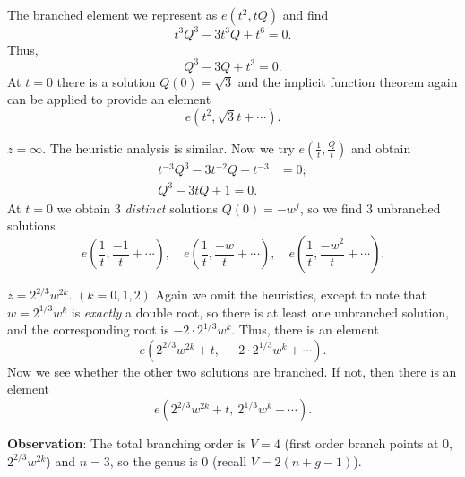\documentclass[a4paper,11pt]{article}
\begin{document}
\begin{mdframed}
  The branched element we represent as $e(t^2, tQ)$ and find
  $$
  t^3 Q^3 - 3t^3 Q + t^6 = 0.
  $$
  Thus,
  $$
  Q^3 - 3Q + t^3 = 0.
  $$
  At $t=0$ there is a solution $Q(0) = \sqrt{3}$ and the implicit
  function theorem again can be applied to provide an element
  $$
  e(t^2, \sqrt{3} t + \cdots).
  $$

  \underline{$z= \infty$}.
  The heuristic analysis is similar. Now we try $e(\frac{1}{t},
  \frac{Q}{t})$ and obtain
  $$
  \begin{aligned}
    t^{-3}Q^3 - 3t^{-2}Q + t^{-3} &= 0;\\
    Q^3 - 3tQ + 1 = 0.
  \end{aligned}
  $$
  At $t = 0$ we obtain 3 \emph{distinct} solutions $Q(0) = -w^j$, so
  we find 3 unbranched solutions
  $$
  e(\frac{1}{t},\frac{-1}{t}+\cdots),\quad
  e(\frac{1}{t},\frac{-w}{t}+\cdots),\quad
  e(\frac{1}{t},\frac{-w^2}{t}+\cdots).
  $$

  \underline{$z = 2^{2/3} w^{2k}$}. $(k=0,1,2)$
  Again we omit the heuristics, except to note that $w = 2^{1/3} w^k$
  is \emph{exactly} a double root, so there is at least one unbranched
  solution, and the corresponding root is $-2 \cdot 2^{1/3} w^k$.
  Thus, there is an element
  $$
  e(2^{2/3} w^{2k} + t,\ -2 \cdot 2^{1/3} w^k + \cdots).
  $$
  Now we see whether the other two solutions are branched.  If not,
  then there is an element
  $$
  e(2^{2/3} w^{2k} + t,\ 2^{1/3} w^k + \cdots).
  $$

  \textbf{Observation}: The total branching order is $V = 4$ (first
  order branch points at 0, $2^{2/3} w^{2k}$) and $n = 3$, so the
  genus is 0 (recall $V = 2(n+g-1)$).
\end{mdframed}
\end{document}
